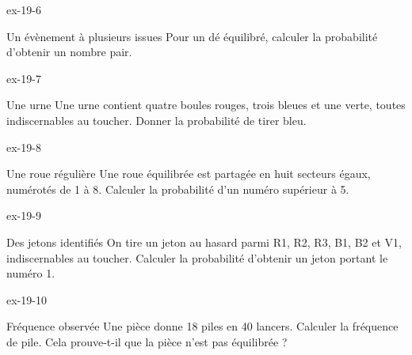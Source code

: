 \begin{blocLivre}{ex-19-6}\begin{exercice}[2]{Un évènement à plusieurs issues}
Pour un dé équilibré, calculer la probabilité d’obtenir un nombre pair.
\end{exercice}\end{blocLivre}
\begin{blocLivre}{ex-19-7}\begin{exercice}[2]{Une urne}
Une urne contient quatre boules rouges, trois bleues et une verte, toutes indiscernables au toucher. Donner la probabilité de tirer bleu.
\label{fig-ex-19-7}
\end{exercice}\end{blocLivre}
\begin{blocLivre}{ex-19-8}\begin{exercice}[2]{Une roue régulière}
Une roue équilibrée est partagée en huit secteurs égaux, numérotés de 1 à 8. Calculer la probabilité d’un numéro supérieur à 5.
\label{fig-ex-19-8}
\end{exercice}\end{blocLivre}
\begin{blocLivre}{ex-19-9}\begin{exercice}[2]{Des jetons identifiés}
On tire un jeton au hasard parmi R1, R2, R3, B1, B2 et V1, indiscernables au toucher. Calculer la probabilité d’obtenir un jeton portant le numéro 1.
\label{fig-ex-19-9}
\end{exercice}\end{blocLivre}
\begin{blocLivre}{ex-19-10}\begin{exercice}[2]{Fréquence observée}
Une pièce donne 18 piles en 40 lancers. Calculer la fréquence de pile. Cela prouve-t-il que la pièce n’est pas équilibrée ?
\end{exercice}\end{blocLivre}


